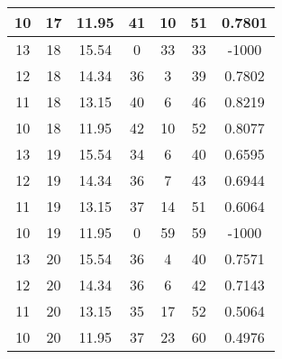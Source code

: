 \documentclass[letterpaper, 12pt]{article}
\begin{document}
\begin{longtable}{|c|c|c|c|c|c|c|}
10 & 17 & 11.95 & 41 & 10 & 51 & 0.7801 \\
\hline
13 & 18 & 15.54 & 0 & 33 & 33 & -1000 \\
\hline
12 & 18 & 14.34 & 36 & 3 & 39 & 0.7802 \\
\hline
11 & 18 & 13.15 & 40 & 6 & 46 & 0.8219 \\
\hline
10 & 18 & 11.95 & 42 & 10 & 52 & 0.8077 \\
\hline
13 & 19 & 15.54 & 34 & 6 & 40 & 0.6595 \\
\hline
12 & 19 & 14.34 & 36 & 7 & 43 & 0.6944 \\
\hline
11 & 19 & 13.15 & 37 & 14 & 51 & 0.6064 \\
\hline
10 & 19 & 11.95 & 0 & 59 & 59 & -1000 \\
\hline
13 & 20 & 15.54 & 36 & 4 & 40 & 0.7571 \\
\hline
12 & 20 & 14.34 & 36 & 6 & 42 & 0.7143 \\
\hline
11 & 20 & 13.15 & 35 & 17 & 52 & 0.5064 \\
\hline
10 & 20 & 11.95 & 37 & 23 & 60 & 0.4976 \\
\hline
\end{longtable}
\end{document}
